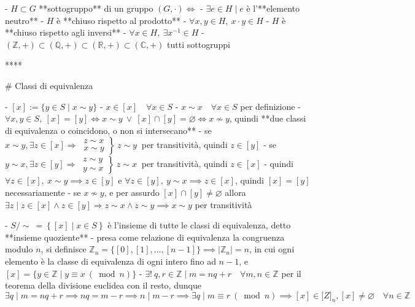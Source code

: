 - $H \subset G$ **sottogruppo** di un gruppo $(G, \cdot)\iff$
    - $\exists e \in H \mid e$ è l'**elemento neutro**
    - $H$ è **chiuso rispetto al prodotto**
        - $\forall x, y \in H, \ x \cdot y \in H$
    -  $H$ è **chiuso rispetto agli inversi**
        -  $\forall x \in H, \ \exists x^{-1} \in H$
-  \( (\mathbb{Z},+) \subset(\mathbb{Q},+) \subset(\mathbb{R},+) \subset(\mathbb{C},+) \) tutti sottogruppi

****

# Classi di equivalenza

- $[x] := \{y \in S \mid x \sim y\}$
  - $x \in [x] \quad \forall x \in S$
    - $x \sim x \quad \forall x \in S$ per definizione
  - $\forall x, y \in S, \ [x] = [y] \iff x \sim y \ \lor \ [x] \cap [y] = \varnothing \iff x \nsim y$, quindi **due classi di equivalenza o coincidono, o non si intersecano**
      - se \( \left.x \sim y, \exists z \in[x] \Rightarrow \ \begin{array}{ll}z  \sim x \\ x \sim y\end{array}\right\} \ z \sim y \ \) per transitività, quindi $z \in [y]$
      - se \( \left.y \sim x, \exists z \in[y] \Rightarrow \ \begin{array}{l}z \sim y \\ y \sim x\end{array}\right\} \ z \sim x \ \) per transitività, quindi $z \in [x]$
      - quindi \( \forall z \in[x], \ x \sim y \implies z \in[y] \) e $\forall z \in  [y], \ y \sim x \implies z \in [x]$, quindi $[x] = [y]$ necessariamente
      - se $x \nsim y$, e per assurdo \( [x] \cap[y] \neq \varnothing \) allora \( \exists z \mid z \in[x] \wedge z \in[y] \Rightarrow z \sim x \wedge z \sim y \implies x \sim y \) per transitività

- \(S/ \sim \ = \left\{ [x] \mid x \in S\right\}\) è l'insieme di tutte le classi di equivalenza, detto **insieme quoziente**
  - presa come relazione di equivalenza la congruenza modulo $n$, si definisce $\mathbb{Z}_n = \{ [0], [1], \ldots,[n - 1]\} \implies \mid \mathbb{Z}_n \mid = n$, in cui ogni elemento è la classe di equivalenza di ogni intero fino ad $n - 1$, e $[x] = \{y \in \mathbb{Z} \mid y \equiv x  \ (\bmod n )\}$
  - \( \exists ! \ q, r \in \mathbb{Z} \mid m=n q+r \quad \forall m, n \in \mathbb{Z} \) per il teorema della divisione euclidea con il resto, dunque \( \exists q \mid  m=n q+r \implies n q=m-r \implies n \mid m-r \implies \exists q \mid m \equiv r \ (\bmod n) \implies [x] \in \mathbb[Z]_n, [x] \neq \varnothing \quad \forall n \in \mathbb{Z}\)

